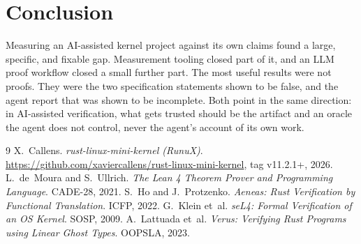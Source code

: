 \documentclass[sigconf,nonacm]{acmart}
\begin{document}
\section{Conclusion}
Measuring an AI-assisted kernel project against its own claims found a large, specific, and fixable gap. Measurement tooling closed part of it, and an LLM proof workflow closed a small further part. The most useful results were not proofs. They were the two specification statements shown to be false, and the agent report that was shown to be incomplete. Both point in the same direction: in AI-assisted verification, what gets trusted should be the artifact and an oracle the agent does not control, never the agent's account of its own work.

\begin{thebibliography}{9}
 X.~Callens. \emph{rust-linux-mini-kernel (RunuX)}. \url{https://github.com/xaviercallens/rust-linux-mini-kernel}, tag v11.2.1+, 2026.
 L.~de~Moura and S.~Ullrich. \emph{The Lean 4 Theorem Prover and Programming Language}. CADE-28, 2021.
 S.~Ho and J.~Protzenko. \emph{Aeneas: Rust Verification by Functional Translation}. ICFP, 2022.
 G.~Klein et~al. \emph{seL4: Formal Verification of an OS Kernel}. SOSP, 2009.
 A.~Lattuada et~al. \emph{Verus: Verifying Rust Programs using Linear Ghost Types}. OOPSLA, 2023.
\end{thebibliography}
\end{document}
